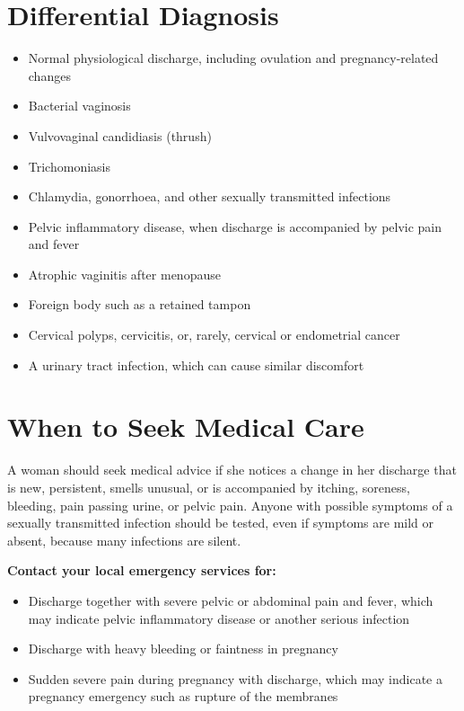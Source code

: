 \section*{Differential Diagnosis}
\begin{itemize}
    \item Normal physiological discharge, including ovulation and pregnancy-related changes
    \item Bacterial vaginosis
    \item Vulvovaginal candidiasis (thrush)
    \item Trichomoniasis
    \item Chlamydia, gonorrhoea, and other sexually transmitted infections
    \item Pelvic inflammatory disease, when discharge is accompanied by pelvic pain and fever
    \item Atrophic vaginitis after menopause
    \item Foreign body such as a retained tampon
    \item Cervical polyps, cervicitis, or, rarely, cervical or endometrial cancer
    \item A urinary tract infection, which can cause similar discomfort
\end{itemize}

\section*{When to Seek Medical Care}
A woman should seek medical advice if she notices a change in her discharge that is new, persistent, smells unusual, or is accompanied by itching, soreness, bleeding, pain passing urine, or pelvic pain. Anyone with possible symptoms of a sexually transmitted infection should be tested, even if symptoms are mild or absent, because many infections are silent.

\textbf{Contact your local emergency services for:}
\begin{itemize}
    \item Discharge together with severe pelvic or abdominal pain and fever, which may indicate pelvic inflammatory disease or another serious infection
    \item Discharge with heavy bleeding or faintness in pregnancy
    \item Sudden severe pain during pregnancy with discharge, which may indicate a pregnancy emergency such as rupture of the membranes
\end{itemize}


